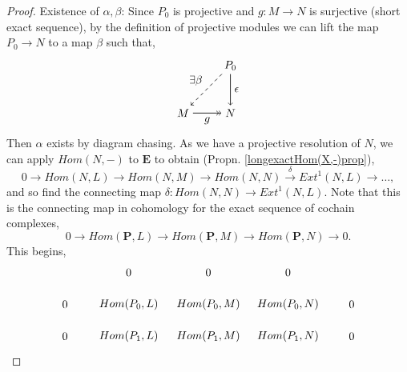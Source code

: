 \documentclass[11.5pt, twoside, a4paper, titlepage]{report}
\theoremstyle{definition}
\theoremstyle{plain}
\begin{document}
\begin{proof}
Existence of $\alpha, \beta$: Since $P_0$ is projective and $g: M\to N$ is surjective (short exact sequence), by the definition of projective modules we can lift the map $P_0 \to N$ to a map $\beta$ such that,
\begin{equation*}
\begin{tikzpicture}[->,-latex, auto, main path/.style={->, semithick}, main node/.style={}]
\node [main node]		(1) at (0,0)		{$M$};
\node [main node]		(2) at (1.5,0)	{$N$};
\node [main node]		(3) at (1.5, 1.5)	{$P_0$};

\draw (1) edge [->>, semithick] node [auto, swap] {$g$} (2);
\draw (3) edge [main path] node [auto] {$\epsilon$} (2);
\draw (3) edge [->, dashed, semithick] node [auto, swap] {$\exists \beta$} (1);
\end{tikzpicture}
\end{equation*}
Then $\alpha$ exists by diagram chasing.
As we have a projective resolution of $N$, we can apply $Hom(N,-)$ to $\mathbf{E}$ to obtain (Propn. \ref{longexactHom(X,-)prop}),
\begin{equation*}
0\xrightarrow{} Hom(N,L) \xrightarrow{} Hom(N,M) \xrightarrow{} Hom(N,N) \xrightarrow{\delta} Ext^1(N,L) \xrightarrow{} \dots,
\end{equation*}
and so find the connecting map $\delta: Hom(N,N) \to Ext^1(N,L)$. Note that this is the connecting map in cohomology for the exact sequence of cochain complexes,
\begin{equation*}
0 \xrightarrow{} Hom(\mathbf{P},L) \xrightarrow{} Hom(\mathbf{P},M) \xrightarrow{} Hom(\mathbf{P},N) \xrightarrow{} 0.
\end{equation*}
This begins,
\begin{equation*}
\begin{tikzpicture}[->,-latex, auto, main path/.style={->, semithick}, main node/.style={}]
\node	[main node]		(2) at (0,0)		{$0$};
\node	[main node]		(3) at (2,0)		{$Hom(P_0, L)$};
\node [main node]		(4) at (4.5,0)	{$Hom(P_0,M)$};
\node [main node]		(5) at (7,0)		{$Hom(P_0, N)$};
\node	[main node]		(11) at (9,0)		{$0$};

\node	[main node]		(7) at (0,-1)		{$0$};
\node	[main node]		(8) at (2,-1)		{$Hom(P_1, L)$};
\node [main node]		(9) at (4.5,-1)	{$Hom(P_1, M)$};
\node [main node]		(10) at (7,-1)		{$Hom(P_1, N)$};
\node [main node]		(13) at (9,-1)	{$0$};

\node [main node]		(-1) at (2,1)		{$0$};
\node [main node]		(-2) at (4.5,1)	{$0$};
\node [main node]		(-3) at (7,1)		{$0$};


\end{tikzpicture}
\end{equation*}
\end{proof}
\end{document}
